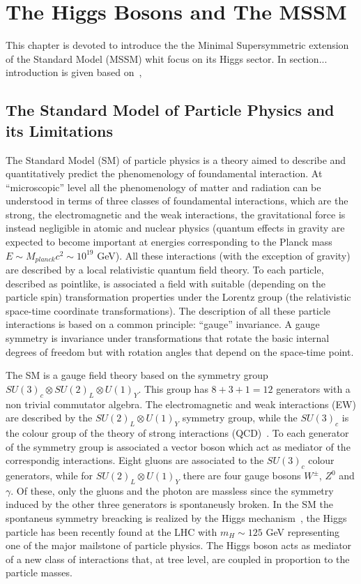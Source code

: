 \chapter{The Higgs Bosons and The MSSM}
This chapter is devoted to introduce the the Minimal Supersymmetric 
extension of the Standard Model (MSSM) whit focus on  its Higgs sector.
In section... introduction is given based on~\cite{Altarelli}, 


\clearpage

\section{The Standard Model of Particle Physics and its Limitations}
The Standard Model (SM) of particle physics is a theory aimed to describe and quantitatively predict
the phenomenology of foundamental interaction. At ``microscopic''  level all the phenomenology of matter and 
radiation can be understood in terms of three classes of foundamental interactions, which are the strong, the electromagnetic
and the weak interactions, the gravitational force is instead negligible in atomic and nuclear physics (quantum effects in gravity are
expected to become important at energies corresponding to the Planck mass $E \sim M_{planck} c^2 \sim 10^{19}$ GeV).
All these interactions (with the exception of gravity) are described by a local relativistic quantum field theory.
To each particle, described as pointlike, is associated a field with suitable
(depending on the particle spin) transformation properties under the Lorentz group (the
relativistic space-time coordinate transformations). The description
of all these particle interactions is based on a common principle: ``gauge'' invariance. A
gauge symmetry is invariance under transformations that rotate the basic internal degrees of freedom but
 with rotation angles that depend on the space-time point.

The SM is a gauge field theory based on the symmetry group $SU(3)_c \otimes SU(2)_L \otimes U(1)_Y$. This group has $8+3+1=12$
generators with a non trivial commutator algebra. The electromagnetic and weak interactions (EW) are described \cite{} by the 
$SU(2)_L \otimes U(1)_Y$ symmetry group, while the $ SU(3)_c$ is the colour group of the theory of strong interactions (QCD)~\cite{}.
To each generator of the symmetry group is associated a vector boson which act as mediator of the correspondig interactions.
Eight gluons are associated to the $ SU(3)_c$ colour generators, while for $SU(2)_L \otimes U(1)_Y$ there are four gauge bosons $W^{\pm}$,
$Z^0$ and $\gamma$. Of these, only the gluons and the photon are massless since the symmetry induced by the other three generators is
spontaneusly broken. In the SM the spontaneus symmetry breacking is realized by the Higgs mechanism~\cite{}, the Higgs particle has 
been recently found at the LHC with $m_H \sim 125$ GeV \cite{} representing one of the major mailstone of particle physics.
The Higgs boson acts as mediator of a new class of interactions that, at tree level, are coupled in proportion to the particle masses.

